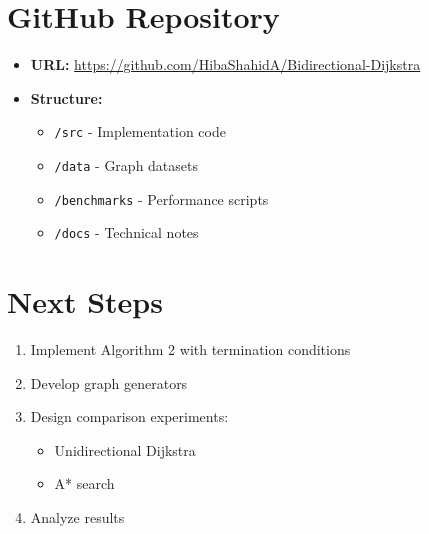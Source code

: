 \documentclass[12pt]{article}
\begin{document}
\section{GitHub Repository}
\begin{itemize}
    \item \textbf{URL:} \url{https://github.com/HibaShahidA/Bidirectional-Dijkstra}
    \item \textbf{Structure:}
    \begin{itemize}
        \item \texttt{/src} - Implementation code
        \item \texttt{/data} - Graph datasets
        \item \texttt{/benchmarks} - Performance scripts
        \item \texttt{/docs} - Technical notes
    \end{itemize}
\end{itemize}

\section{Next Steps}
\begin{enumerate}
    \item Implement Algorithm 2 with termination conditions
    \item Develop graph generators
    \item Design comparison experiments:
    \begin{itemize}
        \item Unidirectional Dijkstra
        \item A* search
    \end{itemize}
    \item Analyze results
\end{enumerate}
\end{document}
